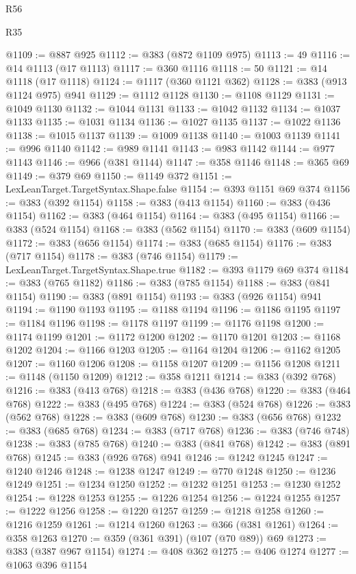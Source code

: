 \begin{lexlean}{R56}
\begin{lexlean}{R35}
\begin{coremodule}
{{{{{{{{{{{{{{{{{{{{{{{{{{{{{{{{{{{{{{{{{{{{{{{{{{{{@1109 := @887 @925
@1112 := @383 (@872 @1109 @975)
@1113 := 49
@1116 := @14 @1113 (@17 @1113)
@1117 := @360 @1116
@1118 := 50
@1121 := @14 @1118 (@17 @1118)
@1124 := @1117 (@360 @1121 @362)
@1128 := @383 (@913 @1124 @975) @941
@1129 := @1112 @1128
@1130 := @1108 @1129
@1131 := @1049 @1130
@1132 := @1044 @1131
@1133 := @1042 @1132
@1134 := @1037 @1133
@1135 := @1031 @1134
@1136 := @1027 @1135
@1137 := @1022 @1136
@1138 := @1015 @1137
@1139 := @1009 @1138
@1140 := @1003 @1139
@1141 := @996 @1140
@1142 := @989 @1141
@1143 := @983 @1142
@1144 := @977 @1143
@1146 := @966 (@381 @1144)
@1147 := @358 @1146
@1148 := @365 @69
@1149 := @379 @69
@1150 := @1149 @372
@1151 := LexLeanTarget.TargetSyntax.Shape.false
@1154 := @393 @1151 @69 @374
@1156 := @383 (@392 @1154)
@1158 := @383 (@413 @1154)
@1160 := @383 (@436 @1154)
@1162 := @383 (@464 @1154)
@1164 := @383 (@495 @1154)
@1166 := @383 (@524 @1154)
@1168 := @383 (@562 @1154)
@1170 := @383 (@609 @1154)
@1172 := @383 (@656 @1154)
@1174 := @383 (@685 @1154)
@1176 := @383 (@717 @1154)
@1178 := @383 (@746 @1154)
@1179 := LexLeanTarget.TargetSyntax.Shape.true
@1182 := @393 @1179 @69 @374
@1184 := @383 (@765 @1182)
@1186 := @383 (@785 @1154)
@1188 := @383 (@841 @1154)
@1190 := @383 (@891 @1154)
@1193 := @383 (@926 @1154) @941
@1194 := @1190 @1193
@1195 := @1188 @1194
@1196 := @1186 @1195
@1197 := @1184 @1196
@1198 := @1178 @1197
@1199 := @1176 @1198
@1200 := @1174 @1199
@1201 := @1172 @1200
@1202 := @1170 @1201
@1203 := @1168 @1202
@1204 := @1166 @1203
@1205 := @1164 @1204
@1206 := @1162 @1205
@1207 := @1160 @1206
@1208 := @1158 @1207
@1209 := @1156 @1208
@1211 := @1148 (@1150 @1209)
@1212 := @358 @1211
@1214 := @383 (@392 @768)
@1216 := @383 (@413 @768)
@1218 := @383 (@436 @768)
@1220 := @383 (@464 @768)
@1222 := @383 (@495 @768)
@1224 := @383 (@524 @768)
@1226 := @383 (@562 @768)
@1228 := @383 (@609 @768)
@1230 := @383 (@656 @768)
@1232 := @383 (@685 @768)
@1234 := @383 (@717 @768)
@1236 := @383 (@746 @748)
@1238 := @383 (@785 @768)
@1240 := @383 (@841 @768)
@1242 := @383 (@891 @768)
@1245 := @383 (@926 @768) @941
@1246 := @1242 @1245
@1247 := @1240 @1246
@1248 := @1238 @1247
@1249 := @770 @1248
@1250 := @1236 @1249
@1251 := @1234 @1250
@1252 := @1232 @1251
@1253 := @1230 @1252
@1254 := @1228 @1253
@1255 := @1226 @1254
@1256 := @1224 @1255
@1257 := @1222 @1256
@1258 := @1220 @1257
@1259 := @1218 @1258
@1260 := @1216 @1259
@1261 := @1214 @1260
@1263 := @366 (@381 @1261)
@1264 := @358 @1263
@1270 := @359 (@361 @391) (@107 (@70 @89)) @69
@1273 := @383 (@387 @967 @1154)
@1274 := @408 @362
@1275 := @406 @1274
@1277 := @1063 @396 @1154
}}}}}}}}}}}}}}}}}}}}}}}}}}}}}}}}}}}}}}}}}}}}}}}}}}}}
\end{coremodule}
\end{lexlean}
\end{lexlean}
